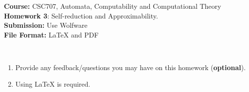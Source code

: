 \documentclass{article}%
\begin{document}
\begin{flushleft}
\textbf{Course:} CSC707, Automata, Computability and Computational Theory\\
\textbf{Homework 3}: Self-reduction and Approximability. \\
\textbf{Submission:} Use Wolfware\\
\textbf{File Format:} LaTeX and PDF\\
\end{flushleft}

\begin{center}
\\
\begin{enumerate}
	\item Provide any feedback/questions you may have on this homework (\textbf{optional}).
	\item Using LaTeX is required.
\end{enumerate}\end{center}

\noindent{\hrulefill}

\bigskip
\end{document}

